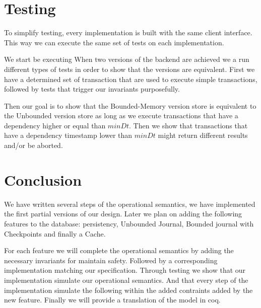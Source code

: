 \documentclass[systeme,french,english]{compas2022}
\begin{document}


\section{Testing}

To simplify testing, every implementation is built with the same client interface. 
This way we can execute the same set of tests on each implementation.

We start be executing 
When two versions of the backend are achieved we a run different types of tests in order to show that the versions are equivalent.
First we have a determined set of transaction that are used to execute simple transactions, followed by tests that trigger our invariants purposefully.

Then our goal is to show that the Bounded-Memory version store is equivalent to the Unbounded version store as long as we execute transactions that have a dependency higher or equal than $\mathit{minDt}$.
Then we show that transactions that have a dependency timestamp lower than $\mathit{minDt}$ might return different results and/or be aborted.

\section{Conclusion}

We have written several steps of the operational semantics, we have implemented the first partial versions of our design.
Later we plan on adding the following features to the database: persistency, Unbounded Journal, Bounded journal with Checkpoints and finally a Cache.

For each feature we will complete the operational semantics by adding the necessary invariants for maintain safety.
Followed by a corresponding implementation matching our specification.
Through testing we show that our implementation simulate our operational semantics.
And that every step of the implementation simulate the following within the added contraints added by the new feature.
Finally we will provide a translation of the model in coq.
\end{document}
